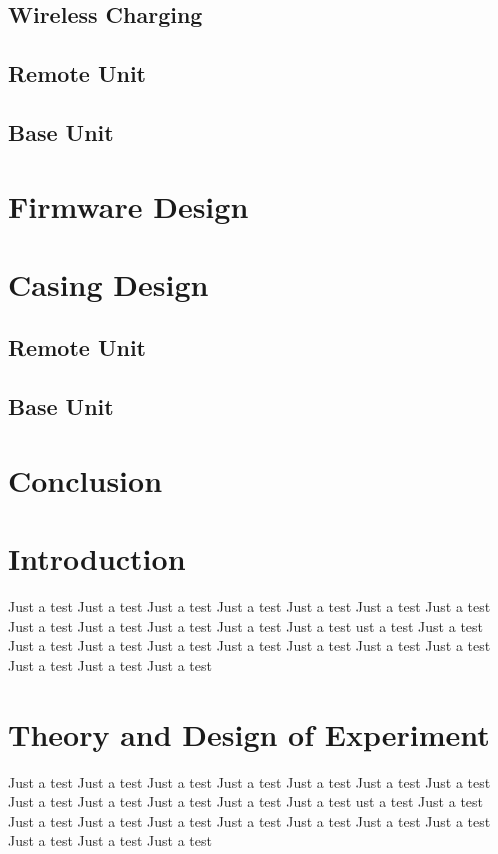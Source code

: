 \documentclass{IIBproject}
\begin{document}
\subsection{Wireless Charging}

\subsection{Remote Unit}

\subsection{Base Unit}

\section{Firmware Design}

\section{Casing Design}

\subsection{Remote Unit}

\subsection{Base Unit}

\section{Conclusion}



\newpage

\section{Introduction}
Just a test Just a test Just a test Just a test Just a test Just a test 
Just a test Just a test Just a test Just a test Just a test Just a test 
ust a test Just a test Just a test Just a test Just a test Just a test 
Just a test Just a test Just a test Just a test Just a test Just a test 

\section{Theory and Design of Experiment}
Just a test Just a test Just a test Just a test Just a test Just a test 
Just a test Just a test Just a test Just a test Just a test Just a test 
ust a test Just a test Just a test Just a test Just a test Just a test 
Just a test Just a test Just a test Just a test Just a test Just a test 
\end{document}
